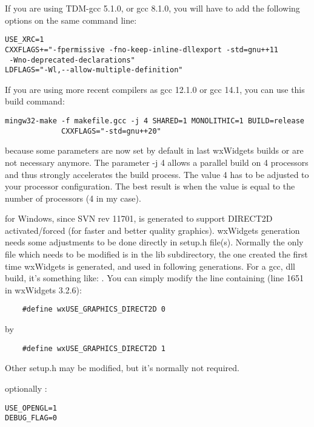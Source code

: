If you are using TDM-gcc 5.1.0, or gcc 8.1.0, you will have to add the following options on the same command line: 
\begin{verbatim}
USE_XRC=1
CXXFLAGS+="-fpermissive	-fno-keep-inline-dllexport -std=gnu++11
 -Wno-deprecated-declarations"
LDFLAGS="-Wl,--allow-multiple-definition"
\end{verbatim}  

If you are using more recent compilers as gcc 12.1.0 or gcc 14.1, you can use this build command:
\begin{verbatim}
mingw32-make -f makefile.gcc -j 4 SHARED=1 MONOLITHIC=1 BUILD=release
             CXXFLAGS="-std=gnu++20"
\end{verbatim}
because some parameters are now set by default in last wxWidgets builds or are not necessary anymore.\newline
The parameter -j 4 allows a parallel build on 4 processors and thus strongly accelerates the build process. The value 4 has to be adjusted to your processor configuration.
The best result is when the value is equal to the number of processors (4 in my case).

\codeblocks for Windows, since SVN rev 11701, is generated to support DIRECT2D activated/forced (for faster and better quality graphics). wxWidgets generation needs some adjustments to be done directly in setup.h file(s). Normally the only file which needs to be modified is in the lib subdirectory, the one created the first time wxWidgets is generated, and used in following generations. For a gcc, dll build, it's something like:\newline
{}.\newline
You can simply modify the line containing (line 1651 in wxWidgets 3.2.6):
\begin{verbatim}
    #define wxUSE_GRAPHICS_DIRECT2D 0 
\end{verbatim}
by
\begin{verbatim}
    #define wxUSE_GRAPHICS_DIRECT2D 1  
\end{verbatim}
Other setup.h may be modified, but it's normally not required.

optionally :
\begin{verbatim}
USE_OPENGL=1
DEBUG_FLAG=0
\end{verbatim}


